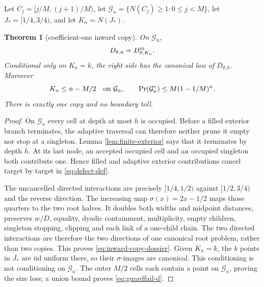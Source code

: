 \documentclass[11pt]{article}
\numberwithin{equation}{section}
\newtheorem{theorem}{Theorem}[section]
\newcommand{\1}{\mathbf 1}\newcommand{\F}{\mathcal F}\newcommand{\D}{\mathcal D}
\begin{document}
Let $C_j=[j/M,(j+1)/M)$, let
$\mathcal G_n=\{N(C_j)\ge1:0\le j<M\}$, let $J_*=[1/4,3/4)$,
and let $K_n=N(J_*)$.
\begin{theorem}[coefficient-one inward copy]\label{thm:inward-copy-dossier}
On $\mathcal G_n$,
\begin{equation}D_{\theta,n}=D^{\rm in}_{\theta,K_n}.          \label{eq:inward-copy-dossier}
\end{equation}
Conditional only on $K_n=k$, the right side has the canonical law of
$D_{\theta,k}$.  Moreover
\begin{equation}K_n\le n-M/2\quad\hbox{on }\mathcal G_n,\qquad
 \Pr(\mathcal G_n^c)\le M(1-1/M)^n.                          \label{eq:guardfail-d}
\end{equation}
There is exactly one copy and no boundary toll.
\end{theorem}
\begin{proof}
On $\mathcal G_n$ every cell at depth at most $h$ is occupied.  Before a
filled exterior branch terminates, the adaptive traversal can therefore
neither prune it empty nor stop at a singleton.  Lemma
\ref{lem:finite-exterior} says that it terminates by depth $h$.  At its last
node, an accepted occupied cell and an occupied singleton both contribute
one.  Hence filled and adaptive exterior contributions cancel target by
target in \eqref{eq:defect-def}.

The uncancelled directed interactions are precisely $[1/4,1/2)$ against
$[1/2,3/4)$ and the reverse direction.  The increasing map
$\sigma(x)=2x-1/2$ maps those quarters to the two root halves.  It doubles
both widths and midpoint distances, preserves $w/D$, equality, dyadic
containment, multiplicity, empty children, singleton stopping, clipping and
each link of a one-child chain.  The two directed interactions are therefore
the two directions of one canonical root problem, rather than two copies.
This proves \eqref{eq:inward-copy-dossier}.  Given $K_n=k$, the $k$ points in
$J_*$ are iid uniform there, so their $\sigma$-images are canonical.  This
conditioning is not conditioning on $\mathcal G_n$.  The outer $M/2$ cells
each contain a point on $\mathcal G_n$, proving the size loss; a union bound
proves \eqref{eq:guardfail-d}.
\end{proof}
\end{document}
